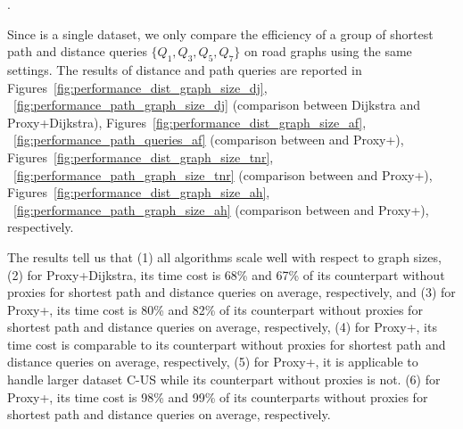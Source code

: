 



.

Since \dblpone is a single dataset, we only compare the efficiency of a group of shortest path and distance queries $\{Q_1, Q_3, Q_5, Q_7\}$  on road graphs using the same settings.
The results of distance and path queries are reported in
Figures~\ref{fig:performance_dist_graph_size_dj}, ~\ref{fig:performance_path_graph_size_dj} (comparison between Dijkstra and Proxy+Dijkstra), Figures~\ref{fig:performance_dist_graph_size_af}, ~\ref{fig:performance_path_queries_af} (comparison between \arcflag and Proxy+\arcflag), Figures~\ref{fig:performance_dist_graph_size_tnr}, ~\ref{fig:performance_path_graph_size_tnr} (comparison between \tnr and Proxy+\tnr), Figures~\ref{fig:performance_dist_graph_size_ah}, ~\ref{fig:performance_path_graph_size_ah} (comparison between \ah and Proxy+\ah), respectively.



The results tell us that (1) all algorithms scale well with respect to graph sizes, (2) for Proxy+Dijkstra, its time cost is 68\% and 67\% of  its counterpart without proxies for shortest path and distance queries on average, respectively, and (3) for Proxy+\arcflag, its time cost is 80\% and 82\% of its counterpart without proxies for shortest  path and distance queries on average, respectively, (4) for Proxy+\tnr, its time cost is comparable to its counterpart without proxies for shortest path and distance queries on average, respectively, (5) for Proxy+\tnr, it is applicable to handle larger dataset C-US while its counterpart \tnr without proxies is not. (6) for Proxy+\ah, its time cost is 98\% and 99\% of its counterparts without proxies for shortest path and distance queries on average, respectively. %


